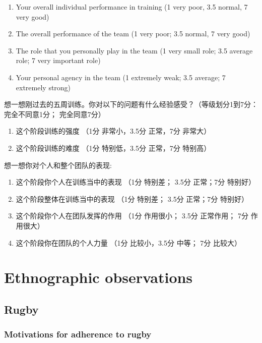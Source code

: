 \begin{CJK}{UTF8}{gbsn}
\begin{enumerate}
\item Your overall individual performance in training (1 very poor, 3.5 normal, 7 very good)
\item The overall performance of the team (1 very poor; 3.5 normal, 7 very good)
\item The role that you personally play in the team (1 very small role; 3.5 average role; 7 very important role)
\item  Your personal agency in the team (1 extremely weak;  3.5 average; 7 extremely strong)
\end{enumerate}


想一想刚过去的五周训练。你对以下的问题有什么经验感受？（等级划分1到7分：完全不同意1分； 完全同意7分）
\begin{enumerate}
\item 这个阶段训练的强度 （1分 非常小，3.5分 正常，7分 非常大）
\item 这个阶段训练的难度 （1分 特别低，3.5分 正常，7分 特别高）
\end{enumerate}

想一想你对个人和整个团队的表现:

\begin{enumerate}
\item 这个阶段你个人在训练当中的表现 （1分 特别差； 3.5分 正常；7分 特别好）
\item 这个阶段整体在训练当中的表现 （1分 特别差； 3.5分 正常；7分 特别好）
\item 这个阶段你个人在团队发挥的作用 （1分 作用很小； 3.5分 正常作用； 7分 作用很大）
\item 这个阶段你在团队的个人力量 （1分 比较小，3.5分 中等； 7分 比较大）
\end{enumerate}





\section{Ethnographic observations}

\subsection{Rugby}

\subsubsection{Motivations for adherence to rugby\label{sect:}}



\end{CJK}
